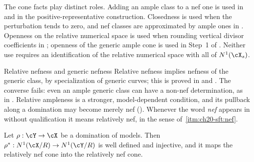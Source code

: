 \begin{remark}
\label{rem:ch20-cone-facts}
The cone facts play distinct roles.  Adding an ample class to a nef one
is used in  and in
the positive-representative construction.  Closedness is used when the
perturbation tends to zero, and nef classes are approximated by ample
ones in .  Openness on the relative numerical
space is used when rounding vertical divisor coefficients in
; openness of the
generic ample cone is used in Step~1 of
.  Neither use requires an
identification of the relative numerical space with all of
$N^1(\cX_s)$.
\end{remark}

\noindent\begin{minipage}{\textwidth}
\begin{warning}{Relative nefness and generic nefness}
Relative nefness implies nefness of the generic class, by specialization
of generic curves; this is proved in
 and
\cite[Lemma~1.2]{BFJ16}.  The converse fails: even an ample generic
class can have a non-nef determination, as in
.
Relative ampleness is a stronger, model-dependent condition, and its
pullback along a domination may become merely nef
().  Whenever the
word \emph{nef} appears in 
without qualification it means relatively nef, in the sense of
\,\cref{itm:ch20-sft:nef}.
\end{warning}
\end{minipage}\par

\begin{lemma}
\label{lem:ch20-pullback-injective}
Let $\rho:\cY\to\cX$ be a domination of models.  Then
$\rho^*:N^1(\cX/R)\to N^1(\cY/R)$ is well defined and injective, and it
maps the relatively nef cone into the relatively nef cone.
\end{lemma}

